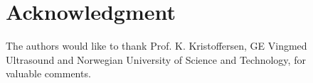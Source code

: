\begin{figure}[!t]






%





\section*{Acknowledgment}
The authors would like to thank Prof. K. Kristoffersen, GE Vingmed Ultrasound and Norwegian University of Science and Technology, for valuable comments. 



\end{figure}
